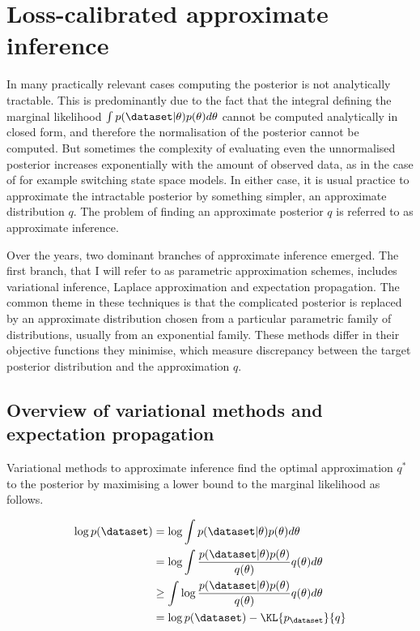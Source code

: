 \section{Loss-calibrated approximate inference}


In many practically relevant cases computing the posterior is not analytically tractable. This is predominantly due to the fact that the integral defining the marginal likelihood $\int p(\dataset\vert\theta)p(\theta)d\theta$ cannot be computed analytically in closed form, and therefore the normalisation of the posterior cannot be computed. But sometimes the complexity of evaluating even the unnormalised posterior increases exponentially with the amount of observed data, as in the case of for example switching state space models. In either case, it is usual practice to approximate the intractable posterior by something simpler, an approximate distribution $q$. The problem of finding an approximate posterior $q$ is referred to as approximate inference.

Over the years, two dominant branches of approximate inference emerged. The first branch, that I will refer to as parametric approximation schemes, includes variational inference, Laplace approximation and expectation propagation. The common theme in these techniques is that the complicated posterior is replaced by an approximate distribution chosen from a particular parametric family of distributions, usually from an exponential family. These methods differ in their objective functions they minimise, which measure discrepancy between the target posterior distribution and the approximation $q$.

\subsection{Overview of variational methods and expectation propagation}

Variational methods to approximate inference find the optimal approximation $q^{*}$ to the posterior by maximising a lower bound to the marginal likelihood as follows.

\begin{align}
	\log p(\dataset) &= \log \int p(\dataset\vert\theta)p(\theta) d\theta\\
		&=\log \int \frac{p(\dataset\vert\theta)p(\theta)}{q(\theta)}q(\theta) d\theta\\
		&\geq \int \log \frac{p(\dataset\vert\theta)p(\theta)}{q(\theta)} q(\theta) d\theta\\
		&= \log p(\dataset) - \KL{p_{\dataset}}{q}
\end{align}

